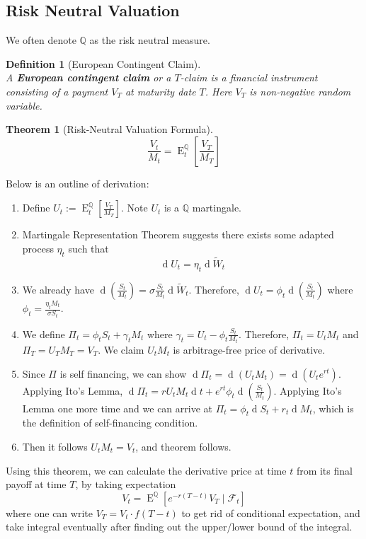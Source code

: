 \documentclass[12pt]{article}
\newtheorem{definition}{Definition}[section]
\newtheorem{theorem}{Theorem}[section]
\theoremstyle{definition}
\DeclareMathOperator{\diff}{d}
\DeclareMathOperator{\expec}{E}
\begin{document}
\subsection{Risk Neutral Valuation}
We often denote $\mathbb{Q}$ as the risk neutral measure.
\begin{definition}[European Contingent Claim]
\hfill\\\normalfont A \textbf{European contingent claim} or a $T$-claim is a financial instrument consisting of a payment $V_T$ at maturity date $T$. Here $V_T$ is non-negative random variable.
\end{definition}
\begin{theorem}[Risk-Neutral Valuation Formula]
\hfill\\\normalfont \[
\frac{V_t}{M_t}=\expec_t^\mathbb{Q}[\frac{V_T}{M_T}]
\]
\end{theorem}
Below is an outline of derivation:
\begin{enumerate}
  \item Define $U_t:=\expec_t^\mathbb{Q}[\frac{V_T}{M_T}]$. Note $U_t$ is a $\mathbb{Q}$ martingale.
  \item Martingale Representation Theorem suggests there exists some adapted process $\eta_t$ such that
  \[
\diff U_t=\eta_t\diff \tilde{W}_t
  \]
  \item We already have $\diff (\frac{S_t}{M_t})=\sigma\frac{S_t}{M_t}\diff \tilde{W}_t$. Therefore, $\diff U_t=\phi_t\diff(\frac{S_t}{M_t})$ where $\phi_t=\frac{\eta_t M_t}{\sigma S_t}$.
  \item We define $\Pi_t=\phi_tS_t+\gamma_tM_t$ where $\gamma_t=U_t-\phi_t\frac{S_t}{M_t}$. Therefore, $\Pi_t=U_tM_t$ and $\Pi_T=U_TM_T=V_T$. We claim $U_tM_t$ is arbitrage-free price of derivative.
  \item Since $\Pi$ is self financing, we can show $\diff \Pi_t=\diff(U_tM_t)=\diff(U_t e^{rt})$. Applying Ito's Lemma, $\diff \Pi_t = rU_tM_t\diff t + e^{rt}\phi_t\diff (\frac{S_t}{M_t})$. Applying Ito's Lemma one more time and we can arrive at $\Pi_t=\phi_t\diff S_t+r_t\diff M_t$, which is the definition of self-financing condition.
  \item Then it follows $U_tM_t=V_t$, and theorem follows.
\end{enumerate}
Using this theorem, we can calculate the derivative price at time $t$ from its final payoff at time $T$, by taking expectation
\[
V_t=\expec^\mathbb{Q}[e^{-r(T-t)}V_T\mid \mathcal{F}_t]
\]
where one can write $V_T=V_t\cdot f(T-t)$ to get rid of conditional expectation, and take integral eventually after finding out the upper/lower bound of the integral.
\end{document}
